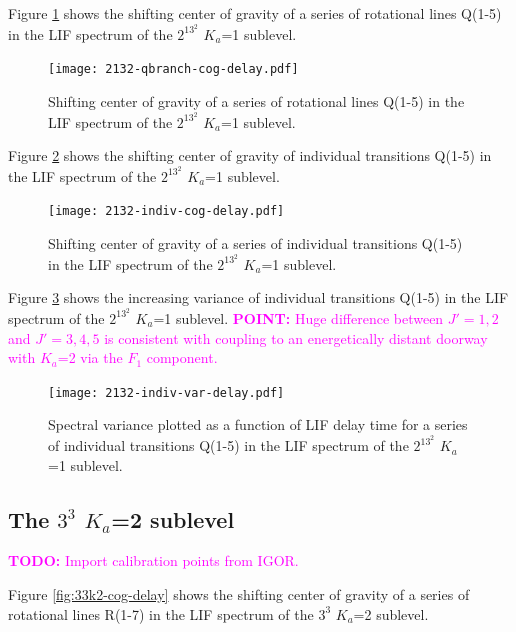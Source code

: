 \documentclass[12pt,draft]{mitthesis}
\newcommand{\TODO} [1]{\textcolor{magenta}{\textbf{TODO:} #1}}
\newcommand{\POINT}[1]{\textcolor{magenta}{\textbf{POINT:} #1}}
\begin{document}
Figure \ref{fig:2132-qbranch-cog-delay} shows the shifting center of
gravity of a series of rotational lines Q(1-5) in the LIF spectrum of
the $2^13^2$ $K_a$=1 sublevel.

\begin{figure}
  \caption{Shifting center of gravity of a series of rotational lines
    Q(1-5) in the LIF spectrum of the $2^13^2$ $K_a$=1 sublevel.}
  \label{fig:2132-qbranch-cog-delay}
  \centering
  \texttt{[image: 2132-qbranch-cog-delay.pdf]}
\end{figure}

Figure \ref{fig:2132-indiv-cog-delay} shows the shifting center of
gravity of individual transitions Q(1-5) in the LIF spectrum of
the $2^13^2$ $K_a$=1 sublevel.

\begin{figure}
  \caption{Shifting center of gravity of a series of individual
    transitions Q(1-5) in the LIF spectrum of the $2^13^2$ $K_a$=1
    sublevel.}
  \label{fig:2132-indiv-cog-delay}
  \centering
  \texttt{[image: 2132-indiv-cog-delay.pdf]}
\end{figure}

Figure \ref{fig:2132-indiv-var-delay} shows the increasing variance of
individual transitions Q(1-5) in the LIF spectrum of the $2^13^2$
$K_a$=1 sublevel.  \POINT{Huge difference between $J'=1,2$ and
  $J'=3,4,5$ is consistent with coupling to an energetically distant
  doorway with $K_a$=2 via the $F_1$ component.}

\begin{figure}
  \caption{Spectral variance plotted as a function of LIF delay time
    for a series of individual transitions Q(1-5) in the LIF spectrum
    of the $2^13^2$ $K_a$=1 sublevel.}
  \label{fig:2132-indiv-var-delay}
  \centering
  \texttt{[image: 2132-indiv-var-delay.pdf]}
\end{figure}

\subsection{The $3^3$ $K_a$=2 sublevel}

\TODO{Import calibration points from IGOR.}

Figure \ref{fig:33k2-cog-delay} shows the shifting center of gravity
of a series of rotational lines R(1-7) in the LIF spectrum of the
$3^3$ $K_a$=2 sublevel.
\end{document}
